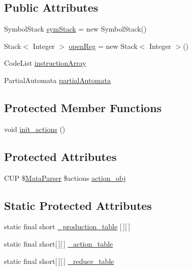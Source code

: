 \subsection*{Public Attributes}
\begin{DoxyCompactItemize}
\item 
Symbol\-Stack \hyperlink{classcas_1_1parser_1_1_mata_parser_aba7f0d768253977ae41bdc34b9a35d22}{sym\-Stack} = new Symbol\-Stack()
\item 
Stack$<$ Integer $>$ \hyperlink{classcas_1_1parser_1_1_mata_parser_a6b4855da7611e701e380aea7477fb48a}{open\-Reg} = new Stack$<$ Integer $>$()
\item 
Code\-List \hyperlink{classcas_1_1parser_1_1_mata_parser_aebf4da5991406e740a80f21a1d44b54f}{instruction\-Array}
\item 
Partial\-Automata \hyperlink{classcas_1_1parser_1_1_mata_parser_af7dd1bb4dc646c7df148a5ea60731f2d}{partial\-Automata}
\end{DoxyCompactItemize}
\subsection*{Protected Member Functions}
\begin{DoxyCompactItemize}
\item 
void \hyperlink{classcas_1_1parser_1_1_mata_parser_a196439f847bfa1e4d791265dbf858cda}{init\-\_\-actions} ()
\end{DoxyCompactItemize}
\subsection*{Protected Attributes}
\begin{DoxyCompactItemize}
\item 
C\-U\-P \$\hyperlink{classcas_1_1parser_1_1_mata_parser}{Mata\-Parser} \$actions \hyperlink{classcas_1_1parser_1_1_mata_parser_aa3869480583db95ded43cab8a9e95076}{action\-\_\-obj}
\end{DoxyCompactItemize}
\subsection*{Static Protected Attributes}
\begin{DoxyCompactItemize}
\item 
static final short \hyperlink{classcas_1_1parser_1_1_mata_parser_a4ef6a5f2a08db3c2e752b4fd24ac5dad}{\-\_\-production\-\_\-table} \mbox{[}$\,$\mbox{]}\mbox{[}$\,$\mbox{]}
\item 
static final short\mbox{[}$\,$\mbox{]}\mbox{[}$\,$\mbox{]} \hyperlink{classcas_1_1parser_1_1_mata_parser_a8d0afaf46e35b1827bb263d8d27bc747}{\-\_\-action\-\_\-table}
\item 
static final short\mbox{[}$\,$\mbox{]}\mbox{[}$\,$\mbox{]} \hyperlink{classcas_1_1parser_1_1_mata_parser_a15d061d34b6b6a927ca9b7c76799dbd7}{\-\_\-reduce\-\_\-table}
\end{DoxyCompactItemize}


